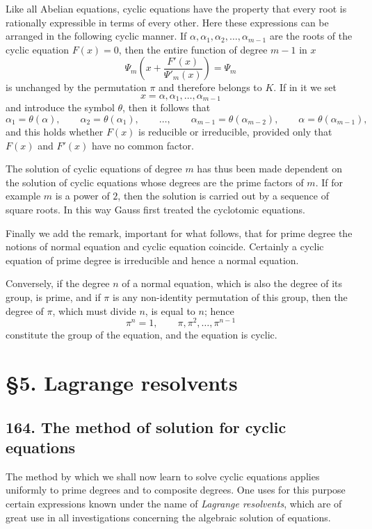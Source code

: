 \documentclass[11pt,a4paper]{book}
\begin{document}
Like all Abelian equations, cyclic equations have the property that every root is rationally expressible in terms of every other. Here these expressions can be arranged in the following cyclic manner. If $\alpha,\alpha_1,\alpha_2,\dots,\alpha_{m-1}$ are the roots of the cyclic equation $F(x)=0$, then the entire function of degree $m-1$ in $x$
\[
\Psi_m\!\left(x+\frac{F'(x)}{\Psi'_m(x)}\right)=\Psi_m
\]
is unchanged by the permutation $\pi$ and therefore belongs to $K$. If in it we set
\[
x=\alpha,\alpha_1,\dots,\alpha_{m-1}
\]
and introduce the symbol $\theta$, then it follows that
\[
\alpha_1=\theta(\alpha),\qquad
\alpha_2=\theta(\alpha_1),\qquad
\dots,\qquad
\alpha_{m-1}=\theta(\alpha_{m-2}),\qquad
\alpha=\theta(\alpha_{m-1}),
\tag{11}
\]
and this holds whether $F(x)$ is reducible or irreducible, provided only that $F(x)$ and $F'(x)$ have no common factor.

The solution of cyclic equations of degree $m$ has thus been made dependent on the solution of cyclic equations whose degrees are the prime factors of $m$. If for example $m$ is a power of $2$, then the solution is carried out by a sequence of square roots. In this way Gauss first treated the cyclotomic equations.

Finally we add the remark, important for what follows, that for prime degree the notions of normal equation and cyclic equation coincide. Certainly a cyclic equation of prime degree is irreducible and hence a normal equation.

Conversely, if the degree $n$ of a normal equation, which is also the degree of its group, is prime, and if $\pi$ is any non-identity permutation of this group, then the degree of $\pi$, which must divide $n$, is equal to $n$; hence
\[
\pi^n=1,\qquad \pi,\pi^2,\dots,\pi^{n-1}
\]
constitute the group of the equation, and the equation is cyclic.

\section*{\S 5. Lagrange resolvents}

\subsection*{164. The method of solution for cyclic equations}

The method by which we shall now learn to solve cyclic equations applies uniformly to prime degrees and to composite degrees. One uses for this purpose certain expressions known under the name of \emph{Lagrange resolvents}, which are of great use in all investigations concerning the algebraic solution of equations.
\end{document}

